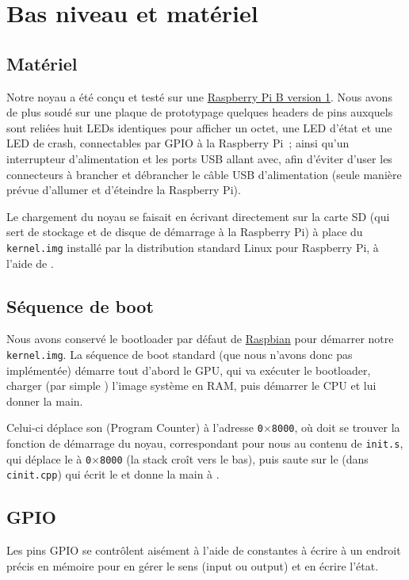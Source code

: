 \documentclass[11pt,a4paper]{article}
\newcommand{\hex}[1]{\texttt{0$\times$#1}}
\newcommand{\fname}[1]{\texttt{#1}} %
\begin{document}
\section{Bas niveau et matériel}

\subsection{Matériel}
Notre noyau a été conçu et testé sur une 
\href{https://www.raspberrypi.org/products/model-b/}{Raspberry Pi B version 1}.
Nous avons de plus soudé sur une plaque de prototypage quelques headers de
pins auxquels sont reliées huit LEDs identiques pour afficher un octet,
une LED d'état et une LED de crash, connectables par GPIO à la Raspberry Pi~;
ainsi qu'un interrupteur d'alimentation et les ports USB allant avec, afin
d'éviter d'user les connecteurs à brancher et débrancher le câble USB
d'alimentation (seule manière prévue d'allumer et d'éteindre la Raspberry Pi).

Le chargement du noyau se faisait en écrivant directement sur la carte SD
(qui sert de stockage et de disque de démarrage à la Raspberry Pi) à place
du \fname{kernel.img} installé par la distribution standard Linux pour
Raspberry Pi, à l'aide de .

\subsection{Séquence de boot}
Nous avons conservé le bootloader par défaut de
\href{https://www.raspberrypi.org/downloads/raspbian/}{Raspbian} pour démarrer
notre \fname{kernel.img}. La séquence de boot standard (que nous n'avons donc
pas implémentée) démarre tout d'abord le GPU, qui va exécuter le bootloader,
charger (par simple ) l'image système en RAM, puis démarrer le
CPU et lui donner la main.

Celui-ci déplace son  (Program Counter) à l'adresse \hex{8000},
où doit se trouver la fonction de démarrage du noyau, correspondant pour nous
au contenu de \fname{init.s}, qui déplace le  à \hex{8000} (la stack
croît vers le bas), puis saute sur le  (dans \fname{cinit.cpp})
qui écrit le  et donne la main à .

\subsection{GPIO}
Les pins GPIO se contrôlent aisément à l'aide de constantes à écrire à un
endroit précis en mémoire pour en gérer le sens (input ou output) et en écrire
l'état.
\end{document}
